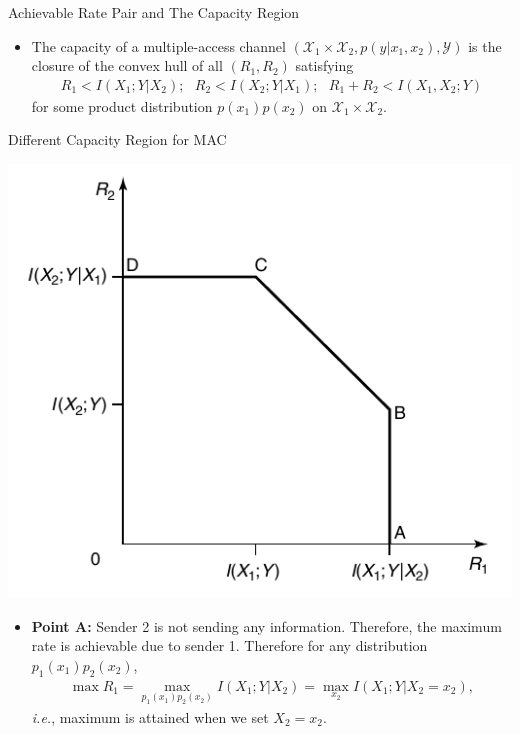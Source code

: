 \documentclass{beamer}
\newcommand{\blue}[1]{{\color{blue} #1}}
\begin{document}
{\begin{frame}{Achievable Rate Pair and The Capacity Region}
\begin{itemize}
\item<3-> \begin{tcolorbox}[colback=blue!10, colframe=blue, title=Theorem for Capacity Region of MAC]
The capacity of a multiple-access channel $(\mathcal{X}_1 \times \mathcal{X}_2, p(y|x_1,x_2), \mathcal{Y})$ is the closure of the convex hull of all $(R_1, R_2)$ satisfying
%
\begin{eqnarray*}
    R_1 < I(X_1; Y|X_2); \text{ }  R_2 < I(X_2; Y|X_1); \text{ } 
    R_1+R_2 < I(X_1, X_2; Y)
\end{eqnarray*}
%
for some product distribution $p(x_1)p(x_2)$ on $\mathcal{X}_1 \times \mathcal{X}_2$.
\end{tcolorbox}
	\end{itemize}
\end{frame}
\begin{frame}{Different Capacity Region for MAC} 
\begin{center}
\includegraphics[scale=0.4]{Diagrams/Achievable region of MAC.png}    
\end{center}
%
\end{frame}

\begin{frame}
%
 \begin{itemize}
	\justifying

\item<1-> \blue{\textbf{Point A:}} Sender 2 is not sending any information. Therefore, the maximum rate is achievable due to sender 1. Therefore for any distribution $p_1(x_1)p_2(x_2)$,
    \begin{eqnarray*}
        \max R_1 = \max_{p_1(x_1)p_2(x_2)}  I(X_1;Y|X_2)= \max_{x_2}  I(X_1;Y|X_2=x_2),
    \end{eqnarray*}
    \textit{i.e.}, maximum is attained when we set $X_2 = x_2$.


\end{itemize}
\end{frame}}
\end{document}
